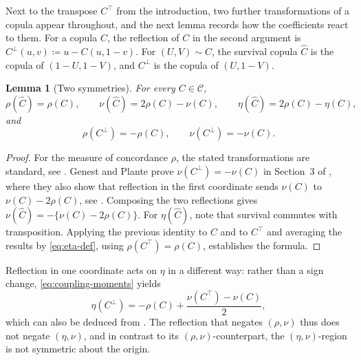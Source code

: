 \documentclass[11pt,a4paper]{article}
\newtheorem{lemma}[theorem]{Lemma}
\theoremstyle{remark}
\newcommand{\1}{\mathbf{1}}
\newcommand{\CC}{\mathcal{C}}
\begin{document}
Next to the transpose $C^\top$ from the introduction, two further transformations of a copula appear throughout, and the next lemma records how the coefficients react to them.
For a copula $C$, the reflection of $C$ in the second argument is $C^\perp(u,v)\coloneqq u-C(u,1-v)$.
For $(U,V)\sim C$, the survival copula $\widehat C$ is the copula of $(1-U,1-V)$, and $C^\perp$ is the copula of $(U,1-V)$.

\begin{lemma}[Two symmetries]
\label{lem:symmetries}
For every $C\in\CC$,
\begin{equation}
  \label{eq:survival-transform}
  \rho(\widehat C)=\rho(C),\qquad
  \nu(\widehat C)=2\rho(C)-\nu(C),\qquad
  \eta(\widehat C)=2\rho(C)-\eta(C),
\end{equation}
and
\begin{equation}
  \label{eq:reflection-transform}
  \rho(C^\perp)=-\rho(C),\qquad
  \nu(C^\perp)=-\nu(C).
\end{equation}
\end{lemma}

\begin{proof}
For the measure of concordance $\rho$, the stated transformations are standard, see \cite{scarsini1984measures}.
Genest and Plante prove $\nu(C^\perp)=-\nu(C)$ in Section~3 of \cite{genest2003blest}, where they also show that reflection in the first coordinate sends $\nu(C)$ to $\nu(C)-2\rho(C)$, see \cite[Frm.~(5)]{genest2003blest}.
Composing the two reflections gives $\nu(\widehat C)=-\{\nu(C)-2\rho(C)\}$.
For $\eta(\widehat C)$, note that survival commutes with transposition.
Applying the previous identity to $C$ and to $C^\top$ and averaging the results by \eqref{eq:eta-def}, using $\rho(C^\top)=\rho(C)$, establishes the formula.
\end{proof}

Reflection in one coordinate acts on $\eta$ in a different way: rather than a sign change, \eqref{eq:coupling-moments} yields
\begin{equation}
  \label{eq:eta-reflection}
  \eta(C^\perp)=-\rho(C)+\frac{\nu(C^\top)-\nu(C)}{2},
\end{equation}
which can also be deduced from \cite[Sec.~4]{genest2003blest}.
The reflection that negates $(\rho,\nu)$ thus does not negate $(\eta,\nu)$, and in contrast to its $(\rho,\nu)$-counterpart, the $(\eta,\nu)$-region is not symmetric about the origin.
\end{document}

